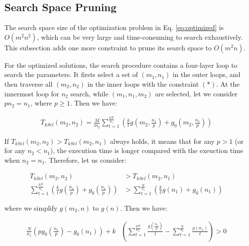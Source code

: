 \subsection{Search Space Pruning}

The search space size of the optimization problem in Eq. \ref{eq:optimized} is $O(m^2n^2)$, which can be very large and time-consuming to search exhaustively. This subsection adds one more constraint to prune its search space to $O(m^2n)$.

For the optimized solutions, the search procedure contains a four-layer loop to search the parameters. It firsts select a set of $(m_{1}, n_{1})$ in the outer loops, and then traverse all $(m_{2}, n_{2})$ in the inner loops with the constraint $(*)$. At the innermost loop for $n_{2}$ search, while $(m_{1}, n_{1}, m_{2})$ are selected, let we consider $pn_{2} = n_{1}$, where $p \ge 1$. Then we have:

\begin{equation}
    \begin{aligned}
        T_{kSel}(m_{2}, n_{2}) = 
            \frac{M}{m_{2}} \sum_{t=1}^{\frac{pN}{n_{1}}}(\frac{k}{t}g(m_{2}, \frac{n_{1}}{p}) + g_{0}(m_{2}, \frac{n_{1}}{p}))
    \end{aligned}
\end{equation}

If $T_{kSel}(m_{2}, n_{2}) > T_{kSel}(m_{2}, n_{1})$ always holds, it means that for any $p > 1$ (or for any $n_{2} < n_{1}$), the execution time is longer compared with the exeuction time when $n_{2} = n_{1}$. Therefore, let us consider:


\begin{equation}
    \begin{aligned}
        T_{kSel}(m_{2}, n_{2}) &> T_{kSel}(m_{2}, n_{1}) \\
        \sum_{t=1}^{\frac{pN}{n_{1}}}(\frac{k}{t}g(\frac{n_{1}}{p}) + g_{0}(\frac{n_{1}}{p})) &> \sum_{t=1}^{\frac{N}{n_{1}}}(\frac{k}{t}g(n_{1}) + g_{0}(n_{1}))
    \end{aligned}
\end{equation}

where we simplify $g(m_{2}, n)$ to $g(n)$. Then we have:


\begin{equation}
    \label{eq:ineq}
    \begin{aligned}
        \frac{N}{n_{1}}(pg_{0}(\frac{n_{1}}{p}) - g_{0}(n_{1})) + k &(\sum_{t=1}^{\frac{pN}{n_{1}}}\frac{g(\frac{n_{1}}{p})}{t} - \sum_{t=1}^{\frac{N}{n_{1}}}\frac{g(n_{1})}{t}) > 0
    \end{aligned}
\end{equation}

